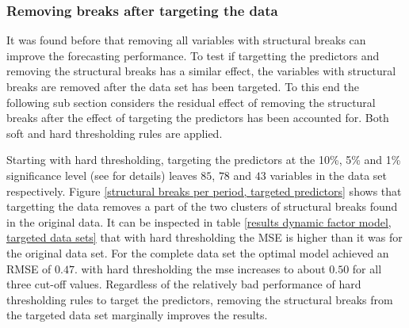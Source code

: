 \documentclass[12pt]{article}
\begin{document}
\subsubsection{Removing breaks after targeting the data}
It was found before that removing all variables with structural breaks can improve the forecasting performance. To test if targetting the predictors and removing the structural breaks has a similar effect, the variables with structural breaks are removed after the data set has been targeted. To this end the following sub section considers the residual effect of removing the structural breaks after the effect of targeting the predictors has been accounted for. Both soft and hard thresholding rules are applied.

Starting with hard thresholding, targeting the predictors at the 10\%, 5\% and 1\% significance level (see \citet{bai2008forecasting} for details) leaves $85$, $78$ and $43$ variables in the data set respectively. Figure \ref{structural breaks per period, targeted predictors} shows that targetting the data removes a part of the two clusters of structural breaks found in the original data. It can be inspected in table \ref{results dynamic factor model, targeted data sets} that with hard thresholding the MSE is higher than it was for the original data set. For the complete data set the optimal model achieved an RMSE of $0.47$. with hard thresholding the mse increases to about $0.50$ for all three cut-off values. Regardless of the relatively bad performance of hard thresholding rules to target the predictors, removing the structural breaks from the targeted data set marginally improves the results.
\end{document}
